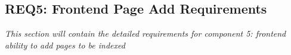 \subsection{REQ5: Frontend Page Add Requirements}

\textit{This section will contain the detailed requirements for component 5: frontend ability to add pages to be indexed}

